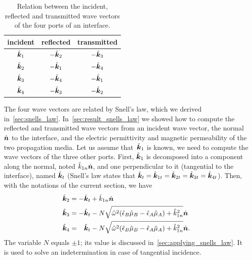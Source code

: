 \begin{table}
    \centering
    \begin{tabular}{ccc}
        \toprule
        incident & reflected & transmitted \\
        \midrule
        $\hat{\bm{k}}_1$ & $-\hat{\bm{k}}_2$ & $-\hat{\bm{k}}_3$ \\
        $\hat{\bm{k}}_2$ & $-\hat{\bm{k}}_1$ & $-\hat{\bm{k}}_4$ \\
        $\hat{\bm{k}}_3$ & $-\hat{\bm{k}}_4$ & $-\hat{\bm{k}}_1$ \\
        $\hat{\bm{k}}_4$ & $-\hat{\bm{k}}_3$ & $-\hat{\bm{k}}_2$ \\
        \bottomrule
    \end{tabular}
    \caption{Relation between the incident, reflected and transmitted wave vectors of the four ports of an interface.}
    \label{tab:inc_ref_tra}
\end{table}
The four wave vectors are related by Snell's law, which we derived in~\cref{sec:snells_law}.
In~\cref{sec:result_snells_law} we showed how to compute the reflected and transmitted wave vectors from an incident wave vector, the normal~$\dot{\bm{n}}$ to the interface, and the electric permittivity and magnetic permeability of the two propagation media.
Let us assume that~$\hat{\bm{k}}_1$ is known, we need to compute the wave vectors of the three other ports.
First, $\hat{\bm{k}}_1$ is decomposed into a component along the normal, noted $\hat{k}_{1n}\dot{\bm{n}}$, and one perpendicular to it (tangential to the interface), named $\hat{\bm{k}}_t$
(Snell's law states that $\hat{\bm{k}}_t=\hat{\bm{k}}_{1t}=\hat{\bm{k}}_{2t}=\hat{\bm{k}}_{3t}=\hat{\bm{k}}_{4t}$).
Then, with the notations of the current section, we have
\begin{align}
    \vectcp{k}_2
    &=
    -\vectcp{k}_t
    +
    \cp{k}_{1n}
    \vectu{n}
    \\
    \vectcp{k}_3
    &=
    -\vectcp{k}_t
    -
    N%
    \sqrt{\cp{\omega}^2 (\cp{\epsilon}_B \cp{\mu}_B - \cp{\epsilon}_A \cp{\mu}_A) + \cp{k}_{1n}^2}
    \vectu{n}
    \\
    \vectcp{k}_4
    &=
    \phantom{\mathrel{-}}
    \vectcp{k}_t
    -
    N%
    \sqrt{\cp{\omega}^2 (\cp{\epsilon}_B \cp{\mu}_B - \cp{\epsilon}_A \cp{\mu}_A) + \cp{k}_{1n}^2}
    \vectu{n}
    \text{.}
\end{align}
The variable $N$ equals $\pm1$; its value is discussed in~\cref{sec:applying_snells_law}.
It is used to solve an indetermination in case of tangential incidence.
